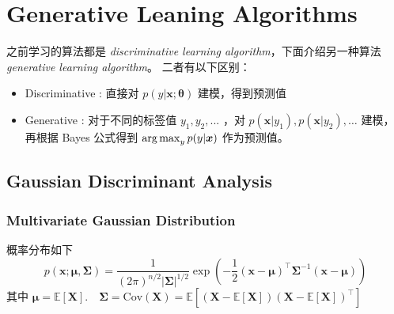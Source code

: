 \chapter{Generative Leaning Algorithms}
	之前学习的算法都是 \emph{discriminative learning algorithm}，下面介绍另一种算法 \emph{generative learning algorithm}。
	二者有以下区别：
	\begin{itemize}
		\item Discriminative : 直接对 $ p(y | \bm{x}; \bm{\theta}) $ 建模，得到预测值
		\item Generative : 对于不同的标签值 $ y_1, y_2, ... $ ，对 $ p(\bm{x} | y_1), p(\bm{x} | y_2), \ldots $ 建模，
		再根据 Bayes 公式得到 $ \operatorname*{arg\,max}_y p(y | \bm{x}) $ 作为预测值。
	\end{itemize}
	
	\section{Gaussian Discriminant Analysis}
		\subsection{Multivariate Gaussian Distribution}
			概率分布如下
			\begin{equation}
				p(\bm{x}; \bm{\mu}, \bm{\Sigma} ) = \frac{1}{(2\pi)^{n/2} |\bm{\Sigma}|^{1/2}} \exp \left( -\frac{1}{2} (\bm{x}-\bm{\mu})^\intercal \bm{\Sigma}^{-1} (\bm{x}-\bm{\mu}) \right)
			\end{equation}
			其中 $ \bm{\mu} = \mathbb{E}[\bm{X}] .\quad \bm{\Sigma} = \text{Cov}(\bm{X}) = \mathbb{E}\left[ (\bm{X}-\mathbb{E}[\bm{X}]) (\bm{X}-\mathbb{E}[\bm{X}])^\intercal \right] $
			
